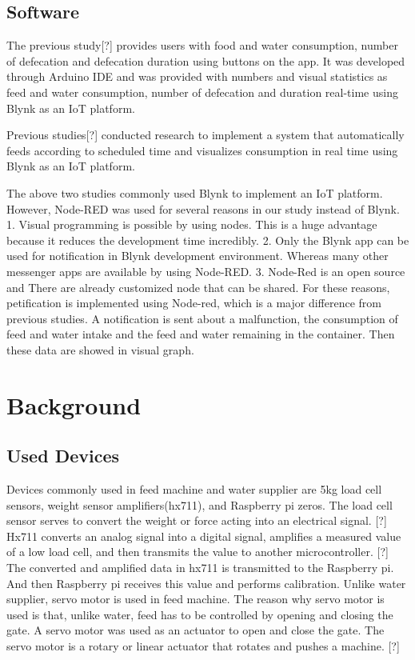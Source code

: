 \documentclass[conference]{IEEEtran}
\begin{document}
\subsection{Software}
  The previous study[?] provides users with food and water consumption, number of defecation and defecation duration using buttons on the app. It was developed through Arduino IDE and was provided with numbers and visual statistics as feed and water consumption, number of defecation and duration real-time using Blynk as an IoT platform.

Previous studies[?] conducted research to implement a system that automatically feeds according to scheduled time and visualizes consumption in real time using Blynk as an IoT platform.


The above two studies commonly used Blynk to implement an IoT platform.
However, Node-RED was used for several reasons in our study instead of Blynk.
1. Visual programming is possible by using nodes. This is a huge advantage because it reduces the development time incredibly. 2. Only the Blynk app can be used for notification in Blynk development environment.
Whereas many other messenger apps are available by using Node-RED. 3. Node-Red is an open source and There are already customized node that can be shared.\hfill\break
\indent For these reasons, petification is implemented using Node-red, which is a major difference from previous studies.
A notification is sent about a malfunction, the consumption of feed and water intake and the feed and water remaining in the container. Then these data are showed in visual graph.
\section{Background}
 \subsection{Used Devices}
Devices commonly used in feed machine and water supplier are 5kg load cell sensors, weight sensor amplifiers(hx711), and Raspberry pi zeros.
The load cell sensor serves to convert the weight or force acting into an electrical signal. [?] 
Hx711 converts an analog signal into a digital signal, amplifies a measured value of a low load cell, and then transmits the value to another microcontroller. [?]
The converted and amplified data in hx711 is transmitted to the Raspberry pi. And then Raspberry pi receives this value and performs calibration.
\hfill \break
\indent Unlike water supplier, servo motor is used in feed machine. The reason why servo motor is used is that, unlike water, feed has to be controlled by opening and closing the gate. A servo motor was used as an actuator to open and close the gate. The servo motor is a rotary or linear actuator that rotates and pushes a machine. [?]
\end{document}
